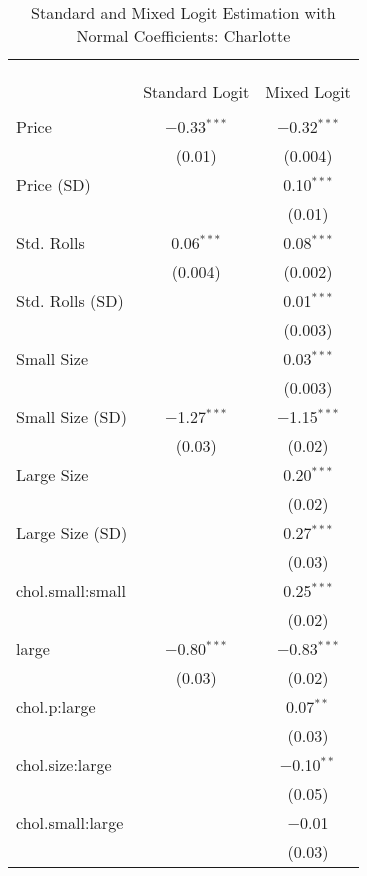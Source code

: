 
\begin{table}[!htbp] \centering 
  \caption{Standard and Mixed Logit Estimation with Normal Coefficients: Charlotte} 
  \label{tab:mnlCharlotteBaseline} 
\begin{tabular}{@{\extracolsep{5pt}}lcc} 
\\[-1.8ex]\hline 
\hline \\[-1.8ex] 
\\[-1.8ex] & \multicolumn{2}{c}{} \\ 
 & Standard Logit & Mixed Logit \\ 
\hline \\[-1.8ex] 
 Price & $-$0.33$^{***}$ & $-$0.32$^{***}$ \\ 
  & (0.01) & (0.004) \\ 
  Price (SD) &  & 0.10$^{***}$ \\ 
  &  & (0.01) \\ 
  Std. Rolls & 0.06$^{***}$ & 0.08$^{***}$ \\ 
  & (0.004) & (0.002) \\ 
  Std. Rolls (SD) &  & 0.01$^{***}$ \\ 
  &  & (0.003) \\ 
  Small Size &  & 0.03$^{***}$ \\ 
  &  & (0.003) \\ 
  Small Size (SD) & $-$1.27$^{***}$ & $-$1.15$^{***}$ \\ 
  & (0.03) & (0.02) \\ 
  Large Size &  & 0.20$^{***}$ \\ 
  &  & (0.02) \\ 
  Large Size (SD) &  & 0.27$^{***}$ \\ 
  &  & (0.03) \\ 
  chol.small:small &  & 0.25$^{***}$ \\ 
  &  & (0.02) \\ 
  large & $-$0.80$^{***}$ & $-$0.83$^{***}$ \\ 
  & (0.03) & (0.02) \\ 
  chol.p:large &  & 0.07$^{**}$ \\ 
  &  & (0.03) \\ 
  chol.size:large &  & $-$0.10$^{**}$ \\ 
  &  & (0.05) \\ 
  chol.small:large &  & $-$0.01 \\ 
  &  & (0.03) \\ 

\end{tabular}
\end{table}
